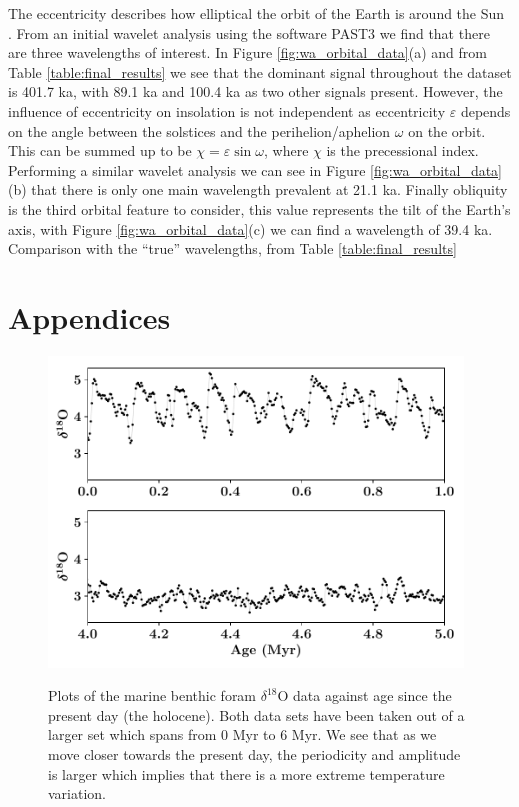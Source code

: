 \documentclass[12pt, onecolumn]{revtex4}    %
\begin{document}
The eccentricity describes how elliptical the orbit of the Earth is around the Sun \cite{carroll_astro}. From an initial wavelet analysis using the software PAST3 \cite{past3} we find that there are three wavelengths of interest. In Figure \ref{fig:wa_orbital_data}(a) and from Table \ref{table:final_results} we see that the dominant signal throughout the dataset is 401.7 ka, with 89.1 ka and 100.4 ka as two other signals present. However, the influence of eccentricity on insolation is not independent as eccentricity $\varepsilon$ depends on the angle between the solstices and the perihelion/aphelion $\omega$ on the orbit. This can be summed up to be $\chi= \varepsilon \sin{\omega}$, where $\chi$ is the precessional index. Performing a similar wavelet analysis we can see in Figure \ref{fig:wa_orbital_data}(b) that there is only one main wavelength prevalent at 21.1 ka. Finally obliquity is the third orbital feature to consider, this value represents the tilt of the Earth's axis, with Figure \ref{fig:wa_orbital_data}(c) we can find a wavelength of 39.4 ka. \\ 

Comparison with the ``true'' wavelengths, from Table \ref{table:final_results} 

\newpage





\newpage

\section*{Appendices}
\begin{figure}[!h]
\begin{center}
\includegraphics[width=11cm]{figures/foram_data}
\caption[]{Plots of the marine benthic foram $\delta^{18}$O data against age since the present day (the holocene). Both data sets have been taken out of a larger set which spans from 0 Myr to 6 Myr. We see that as we move closer towards the present day, the periodicity and amplitude is larger which implies that there is a more extreme temperature variation.}
\vspace{-3ex}
\label{fig:foram_data}
\end{center}
\end{figure}
\end{document}
